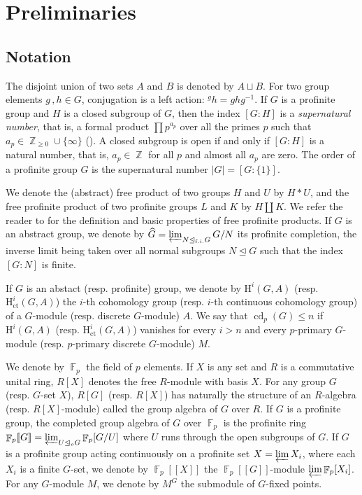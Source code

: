 \documentclass[a4paper]{amsart}
\theoremstyle{definition}
\theoremstyle{remark}
\DeclareMathOperator{\bbz}{\mathbb{Z}}
\DeclareMathOperator{\bbf}{\mathbb{F}}
\DeclareMathOperator{\cd}{\mathrm{cd}}
\newcommand{\Falgebra}[1]{\bbf_p[#1]}
\newcommand{\FFalgebra}[1]{\bbf_p[\![#1]\!]}
\newcommand{\HH}{\mathrm{H}}
\begin{document}
\section{Preliminaries}\label{sect:prelim}

\subsection{Notation}

The disjoint union of two sets \(A\) and \(B\) is denoted by \(A \sqcup B\). For two group elements \(g\,, h \in G\), conjugation is a left action: \(^ gh = ghg^{-1}\). If \(G\) is a profinite group and \(H\) is a closed subgroup of \(G\), then the index \([G\colon H]\) is a \emph{supernatural number}, that is, a formal product \(\prod p^{a_p}\) over all the primes \(p\) such that \(a_p \in \bbz_{\geq 0}\cup \{\infty\}\) (\cite[Sec. 2.3]{ribesProfiniteGraphsGroups2017}). A closed subgroup is open if and only if \([G\colon H]\) is a natural number, that is, \(a_p \in \bbz\) for all \(p\) and almost all \(a_p\) are zero. The order of a profinite group \(G\) is the supernatural number \(|G| =[G\colon \{1\}]\).

We denote the (abstract) free product of two groups \(H\) and \(U\) by \(H * U\), and the free profinite product of two profinite groups \(L\) and \(K\) by \(H \amalg K\). We refer the reader to \cite[Ch. 9]{RibesZalesskii2010} for the definition and basic properties of free profinite products. If \(G\) is an abstract group, we denote by \(\widehat{G} = \varprojlim_{N \unlhd_{\mathrm{f.i.}} G} G/N\) its profinite completion, the inverse limit being taken over all normal subgroups \(N \unlhd G\) such that the index \([G\colon N]\) is finite.

If \(G\) is an abstact (resp. profinite) group, we denote by \(\HH^i(G,A)\) (resp. \(\HH^i_{\mathrm{ct}}(G,A)\)) the \(i\)-th cohomology group (resp. \(i\)-th continuous cohomology group) of a \(G\)-module (resp. discrete \(G\)-module) \(A\). We say that \(\cd_p(G) \leq n\) if \(\HH^i(G,A)\) (resp. \(\HH^i_{\mathrm{ct}}(G,A)\)) vanishes for every \(i > n\) and every \(p\)-primary \(G\)-module (resp. \(p\)-primary discrete \(G\)-module) \(M\).

We denote by \(\bbf_p\) the field of \(p\) elements. If \(X\) is any set and \(R\) is a commutative unital ring, \(R[X]\) denotes the free \(R\)-module with basis \(X\). For any group \(G\) (resp. \(G\)-set \(X\)), \(R[G]\) (resp. \(R[X]\)) has naturally the structure of an \(R\)-algebra (resp. \(R[X]\)-module) called the group algebra of \(G\) over \(R\). If \(G\) is a profinite group, the completed group algebra of \(G\) over \(\bbf_p\) is the profinite ring \(\FFalgebra{G} = \varprojlim_{U \unlhd_o G} \Falgebra{G/U}\) where \(U\) runs through the open subgroups of \(G\). If \(G\) is a profinite group acting continuously on a profinite set \(X = \varprojlim X_i\), where each \(X_i\) is a finite \(G\)-set, we denote by \(\FFalgebra{X}\) the \(\FFalgebra{G}\)-module \(\varprojlim \Falgebra{X_i}\). For any \(G\)-module \(M\), we denote by \(M^G\) the submodule of \(G\)-fixed points.
\end{document}
